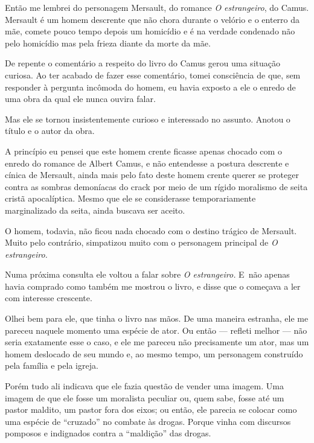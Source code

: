 Então me lembrei do personagem Mersault, do romance \emph{O estrangeiro},
do Camus. Mersault é um homem descrente que não chora durante o velório
e o enterro da mãe, comete pouco tempo depois um homicídio e é na
verdade condenado não pelo homicídio mas pela frieza diante da morte da
mãe.

\asterisc{}

De repente o comentário a respeito do livro do Camus gerou uma situação
curiosa. Ao ter acabado de fazer esse comentário, tomei consciência de
que, sem responder à pergunta incômoda do homem, eu havia exposto a ele
o enredo de uma obra da qual ele nunca ouvira falar.

Mas ele se tornou insistentemente curioso e interessado no assunto.
Anotou o título e o autor da obra.

A princípio eu pensei que este homem crente ficasse apenas chocado com o
enredo do romance de Albert Camus, e não entendesse a postura descrente
e cínica de Mersault, ainda mais pelo fato deste homem crente querer se
proteger contra as sombras demoníacas do crack por meio de um rígido
moralismo de seita cristã apocalíptica. Mesmo que ele se considerasse
temporariamente marginalizado da seita, ainda buscava ser aceito.

O homem, todavia, não ficou nada chocado com o destino trágico de
Mersault. Muito pelo contrário, simpatizou muito com o personagem
principal de \emph{O estrangeiro.}

\asterisc{}

Numa próxima consulta ele voltou a falar sobre \emph{O estrangeiro.} E~não
apenas havia comprado como também me mostrou o livro, e disse que o
começava a ler com interesse crescente.

Olhei bem para ele, que tinha o livro nas mãos. De uma maneira estranha,
ele me pareceu naquele momento uma espécie de ator. Ou então --- refleti
melhor --- não seria exatamente esse o caso, e ele me pareceu não
precisamente um ator, mas um homem deslocado de seu mundo e, ao mesmo
tempo, um personagem construído pela família e pela igreja.

Porém tudo ali indicava que ele fazia questão de vender uma imagem. Uma
imagem de que ele fosse um moralista peculiar ou, quem sabe, fosse até
um pastor maldito, um pastor fora dos eixos; ou então, ele parecia se
colocar como uma espécie de ``cruzado'' no combate às drogas. Porque
vinha com discursos pomposos e indignados contra a ``maldição'' das
drogas.

\asterisc{}

